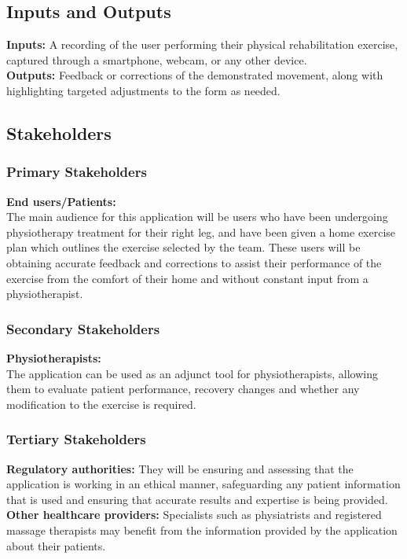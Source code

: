 \documentclass{article}
\begin{document}
\subsection{Inputs and Outputs}

\textbf{Inputs:} A recording of the user performing their physical rehabilitation exercise, captured through a smartphone, webcam, or any other device. \\
\textbf{Outputs:} Feedback or corrections of the demonstrated movement, along with highlighting targeted adjustments to the form as needed. 

\subsection{Stakeholders}
  \subsubsection{Primary Stakeholders}
    \textbf{End users/Patients:} \\
      The main audience for this application will be users who have been undergoing physiotherapy treatment for their right leg, and have been given a home exercise plan which outlines the exercise selected by the team. 
      These users will be obtaining accurate feedback and corrections to assist their performance of the exercise from the comfort of their home and without constant input from a physiotherapist.
     
  \subsubsection{Secondary Stakeholders}
    \textbf{Physiotherapists:} \\
      The application can be used as an adjunct tool for physiotherapists, allowing them to evaluate patient performance, recovery changes and whether any modification to the exercise is required. \\
      
  \subsubsection{Tertiary Stakeholders}
    \textbf{Regulatory authorities:}
      They will be ensuring and assessing that the application is working in an ethical manner, safeguarding any patient information that is used and ensuring that accurate results and expertise is being provided. \\
    \textbf{Other healthcare providers:}
       Specialists such as physiatrists and registered massage therapists may benefit from the information provided by the application about their patients. 
\end{document}
